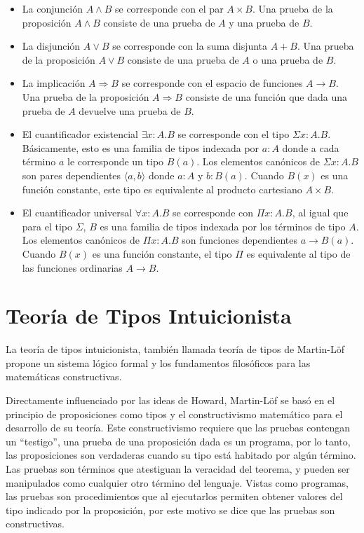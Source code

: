 \begin{itemize}
	\item La conjunción $A \wedge B$ se corresponde con el par $A \times B$.
	Una prueba de la proposición $A \wedge B$ consiste de una prueba de $A$ y una prueba de $B$.
	
	\item La disjunción $A \vee B$ se corresponde con la suma disjunta $A + B$.
	Una prueba de la proposición $A \vee B$ consiste de una prueba de $A$ o una prueba de $B$.
	
	\item La implicación $A \Rightarrow B$ se corresponde con el espacio de funciones $A \rightarrow B$.
	Una prueba de la proposición $A \Rightarrow B$ consiste de una función que dada una prueba de $A$ devuelve una prueba de $B$.
	
	\item El cuantificador existencial $\exists x:A.B$ se corresponde con el tipo $\Sigma x:A.B$.
	Básicamente, esto es una familia de tipos indexada por $a : A$ donde a cada término $a$ le corresponde un tipo $B(a)$.
	Los elementos canónicos de $\Sigma x:A.B$ son pares dependientes $\langle a, b \rangle$ donde $a:A$ y $b:B(a)$.
	Cuando $B(x)$ es una función constante, este tipo es equivalente al producto cartesiano $A \times B$.
	
	
	\item El cuantificador universal $\forall x:A.B$ se corresponde con $\Pi x:A.B$, al igual que para el tipo $\Sigma$, $B$ es una familia de tipos indexada por los términos de tipo $A$.
	Los elementos canónicos de $\Pi x:A.B$ son funciones dependientes $a \rightarrow B(a)$.
	Cuando $B(x)$ es una función constante, el tipo $\Pi$ es equivalente al tipo de las funciones ordinarias $A \rightarrow B$.
\end{itemize}


\section{Teoría de Tipos Intuicionista}
La teoría de tipos intuicionista, también llamada teoría de tipos de Martin-Löf \cite{MLTT72, MLTT73, MLTT79, Bibliopolis} propone un sistema lógico formal y los fundamentos filosóficos para las matemáticas constructivas.

Directamente influenciado por las ideas de Howard, Martin-Löf se basó en el principio de proposiciones como tipos y el constructivismo matemático para el desarrollo de su teoría.
Este constructivismo requiere que las pruebas contengan un ``testigo'', una prueba de una proposición dada es un programa, por lo tanto, las proposiciones son verdaderas cuando su tipo está habitado por algún término.
Las pruebas son términos que atestiguan la veracidad del teorema, y pueden ser manipulados como cualquier otro término del lenguaje.
Vistas como programas, las pruebas son procedimientos que al ejecutarlos permiten obtener valores del tipo indicado por la proposición, por este motivo se dice que las pruebas son constructivas.

